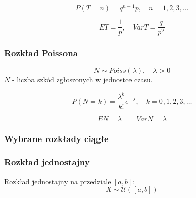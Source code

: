 \documentclass[../Matematyka.tex]{subfiles}
\begin{document}
\[P(T=n) = q^{n-1}p, \quad n = 1,2,3,\ldots\]

\[ET = \frac{1}{p}, \quad VarT = \frac{q}{p^2}\]

\subsubsection*{Rozkład Poissona}
\[N \sim Poiss(\lambda), \quad \lambda > 0\]
\(N\) - liczba szkód zgłoszonych w jednostce czasu.

\[P(N = k) = \frac{\lambda^k}{k!}e^{-\lambda}, \quad k = 0,1,2,3,\ldots\]

\[EN = \lambda \qquad VarN = \lambda\]

\subsubsection{Wybrane rozkłady ciągłe}
\subsubsection*{Rozkład jednostajny}
Rozkład jednostajny na przedziale \([a, b]\):
\[X \sim \mathcal{U}([a,b])\]
\end{document}
